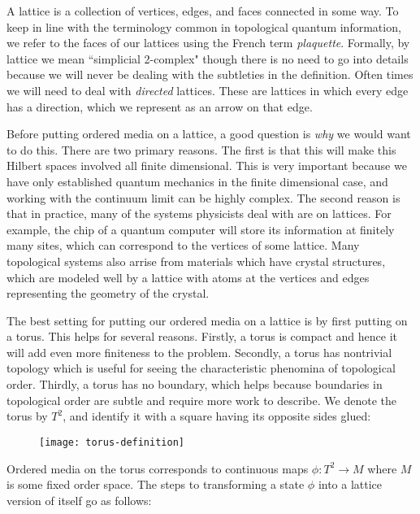 A lattice is a collection of vertices, edges, and faces connected in some way. To keep in line with the terminology common in topological quantum information, we refer to the faces of our lattices using the French term \textit{plaquette}. Formally, by lattice we mean ``simplicial 2-complex" though there is no need to go into details because we will never be dealing with the subtleties in the definition. Often times we will need to deal with \textit{directed} lattices. These are lattices in which every edge has a direction, which we represent as an arrow on that edge.

Before putting ordered media on a lattice, a good question is \textit{why} we would want to do this. There are two primary reasons. The first is that this will make this Hilbert spaces involved all finite dimensional. This is very important because we have only established quantum mechanics in the finite dimensional case, and working with the continuum limit can be highly complex. The second reason is that in practice, many of the systems physicists deal with are on lattices. For example, the chip of a quantum computer will store its information at finitely many sites, which can correspond to the vertices of some lattice. Many topological systems also arrise from materials which have crystal structures, which are modeled well by a lattice with atoms at the vertices and edges representing the geometry of the crystal.

The best setting for putting our ordered media on a lattice is by first putting on a torus. This helps for several reasons. Firstly, a torus is compact and hence it will add even more finiteness to the problem. Secondly, a torus has nontrivial topology which is useful for seeing the characteristic phenomina of topological order. Thirdly, a torus has no boundary, which helps because boundaries in topological order are subtle and require more work to describe. We denote the torus by $T^2$, and identify it with a square having its opposite sides glued:

\begin{figure}[h]
\begin{center}
\texttt{[image: torus-definition]}
\end{center}
\end{figure}

Ordered media on the torus corresponds to continuous maps $\phi: T^2\to M$ where $M$ is some fixed order space. The steps to transforming a state $\phi$ into a lattice version of itself go as follows:

